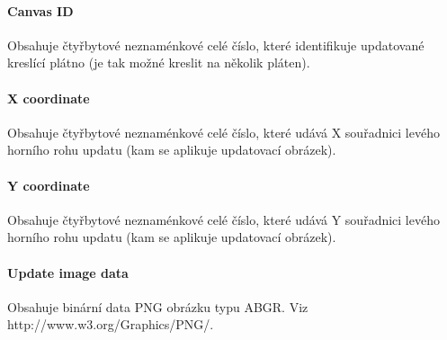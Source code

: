 \documentclass[12pt,oneside,a4paper]{report}
\begin{document}
\paragraph{Canvas ID}
Obsahuje čtyřbytové neznaménkové celé číslo, které identifikuje updatované kreslící plátno (je tak možné kreslit na několik pláten).

\paragraph{X coordinate}
Obsahuje čtyřbytové neznaménkové celé číslo, které udává X souřadnici levého horního rohu updatu (kam se aplikuje updatovací obrázek).

\paragraph{Y coordinate}
Obsahuje čtyřbytové neznaménkové celé číslo, které udává Y souřadnici levého horního rohu updatu (kam se aplikuje updatovací obrázek).

\paragraph{Update image data}
Obsahuje binární data PNG obrázku typu ABGR. Viz http://www.w3.org/Graphics/PNG/. 
\end{document}
